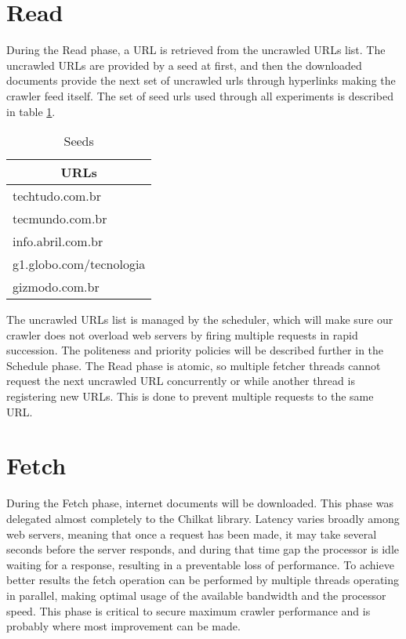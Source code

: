 \documentclass{report}
\begin{document}
\section{Read}

During the Read phase, a URL is retrieved from the uncrawled URLs list. The uncrawled URLs are
provided by a seed at first, and then the downloaded documents provide the next set of uncrawled
urls through hyperlinks making the crawler feed itself. The set of seed urls used through all experiments 
is described in table \ref{tab:seeds}.

\begin{table}
\centering
\begin{tabular}{ |l| }
  \hline
  \multicolumn{1}{|c|}{ URLs } \\
  \hline
  techtudo.com.br \\
  tecmundo.com.br \\
  info.abril.com.br \\
  g1.globo.com/tecnologia \\
  gizmodo.com.br \\
  \hline
\end{tabular}
\caption{Seeds}
\label{tab:seeds}
\end{table}

The uncrawled URLs list is managed by the scheduler, which will make sure our crawler does not
overload web servers by firing multiple requests in rapid succession. The politeness and priority policies
will be described further in the Schedule phase. The Read phase is atomic, so
multiple fetcher threads cannot request the next uncrawled URL concurrently or while another
thread is registering new URLs. This is done to prevent multiple requests to the same URL.

\section{Fetch}

During the Fetch phase, internet documents will be downloaded. This phase was delegated almost 
completely to the Chilkat library.
Latency varies broadly among web servers, meaning that once a request has been made, it may 
take several seconds before the server responds, and during that time gap the processor is
idle waiting for a response, resulting in a preventable loss of performance. To achieve better results the 
fetch operation can be performed by multiple threads operating in parallel, making optimal usage
of the available bandwidth and the processor speed. This phase is critical to secure maximum crawler 
performance and is probably where most improvement can be made.
\end{document}
